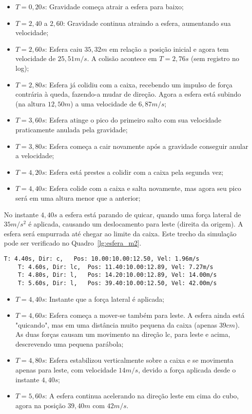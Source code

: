 \documentclass[12pt]{article}
\begin{document}
\begin{itemize}
	\item $T=0,20s$: Gravidade começa atrair a esfera para baixo;
	\item $T=2,40$ a $2,60$: Gravidade continua atraindo a esfera, aumentando sua velocidade;
	\item $T=2,60s$: Esfera caiu $35,32m$ em relação a posição inicial e agora tem velocidade de $25,51m/s$. A colisão acontece em $T=2,76s$ (sem registro no log);
	\item $T=2,80s$: Esfera já colidiu com a caixa, recebendo um impulso de força contrária à queda, fazendo-a mudar de direção. Agora a esfera está subindo (na altura $12,50m$) a uma velocidade de $6,87m/s$;
	\item $T=3,60s$: Esfera atinge o pico do primeiro salto com sua velocidade praticamente anulada pela gravidade;
	\item $T=3,80s$: Esfera começa a cair novamente após a gravidade conseguir anular a velocidade;
	\item $T=4,20s$: Esfera está prestes a colidir com a caixa pela segunda vez;
	\item $T=4,40s$: Esfera colide com a caixa e salta novamente, mas agora seu pico será em uma altura menor que a anterior;  
\end{itemize}

No instante $4,40s$ a esfera está parando de quicar, quando uma força lateral de $35m/s^{2}$ é aplicada, causando um deslocamento para leste (direita da origem). A esfera será empurrada até chegar ao limite da caixa. Este trecho da simulação pode ser verificado no Quadro~\ref{lg:esfera_m2}.


\begin{lstlisting}[frame=single,caption=Registro Acessível: Esfera sobre a caixa. \label{lg:esfera_m2}]
	T: 4.40s, Dir: c, 	Pos: 10.00:10.00:12.50, Vel: 1.96m/s
	T: 4.60s, Dir: lc, 	Pos: 11.40:10.00:12.89, Vel: 7.27m/s
	T: 4.80s, Dir: l, 	Pos: 14.20:10.00:12.89, Vel: 14.00m/s
	T: 5.60s, Dir: l, 	Pos: 39.40:10.00:12.50, Vel: 42.00m/s
\end{lstlisting}

\begin{itemize}
	\item $T=4,40s$: Instante que a força lateral é aplicada;
	\item $T=4,60s$: Esfera começa a mover-se também para leste. A esfera ainda está "quicando", mas em uma distância muito pequena da caixa (apenas $39cm$). As duas forças causam um movimento na direção lc, para leste e acima, descrevendo uma pequena parábola;
	\item $T=4,80s$: Esfera estabilizou verticalmente sobre a caixa e se movimenta apenas para leste, com velocidade $14m/s$, devido a força aplicada desde o instante $4,40s$; 
	\item $T=5,60s$: A esfera continua acelerando na direção leste em cima do cubo, agora na posição $39,40m$ com $42m/s$.
\end{itemize}
\end{document}

